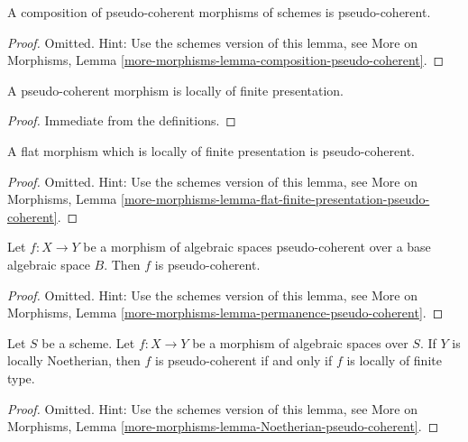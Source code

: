 \begin{lemma}
\label{lemma-composition-pseudo-coherent}
A composition of pseudo-coherent morphisms of schemes is
pseudo-coherent.
\end{lemma}

\begin{proof}
Omitted. Hint: Use the schemes version of this lemma, see
More on Morphisms,
Lemma \ref{more-morphisms-lemma-composition-pseudo-coherent}.
\end{proof}

\begin{lemma}
\label{lemma-pseudo-coherent-finite-presentation}
A pseudo-coherent morphism is locally of finite presentation.
\end{lemma}

\begin{proof}
Immediate from the definitions.
\end{proof}

\begin{lemma}
\label{lemma-flat-finite-presentation-pseudo-coherent}
A flat morphism which is locally of finite presentation is pseudo-coherent.
\end{lemma}

\begin{proof}
Omitted. Hint: Use the schemes version of this lemma, see
More on Morphisms,
Lemma \ref{more-morphisms-lemma-flat-finite-presentation-pseudo-coherent}.
\end{proof}

\begin{lemma}
\label{lemma-permanence-pseudo-coherent}
Let $f : X \to Y$ be a morphism of algebraic spaces pseudo-coherent
over a base algebraic space $B$. Then $f$ is pseudo-coherent.
\end{lemma}

\begin{proof}
Omitted. Hint: Use the schemes version of this lemma, see
More on Morphisms,
Lemma \ref{more-morphisms-lemma-permanence-pseudo-coherent}.
\end{proof}

\begin{lemma}
\label{lemma-Noetherian-pseudo-coherent}
Let $S$ be a scheme. Let $f : X \to Y$ be a morphism of algebraic spaces
over $S$. If $Y$ is locally Noetherian, then $f$ is pseudo-coherent if
and only if $f$ is locally of finite type.
\end{lemma}

\begin{proof}
Omitted. Hint: Use the schemes version of this lemma, see
More on Morphisms,
Lemma \ref{more-morphisms-lemma-Noetherian-pseudo-coherent}.
\end{proof}








